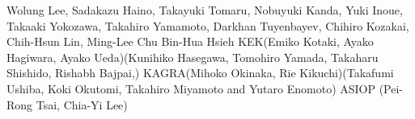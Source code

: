 Wolung Lee, Sadakazu Haino, Takayuki Tomaru, Nobuyuki Kanda, Yuki Inoue, Takaaki Yokozawa, Takahiro Yamamoto, Darkhan Tuyenbayev, Chihiro Kozakai, Chih-Hsun Lin, Ming-Lee Chu
Bin-Hua Hsieh KEK(Emiko Kotaki, Ayako Hagiwara, Ayako Ueda)(Kunihiko Hasegawa, Tomohiro Yamada, Takaharu Shishido, Rishabh Bajpai,) KAGRA(Mihoko Okinaka, Rie Kikuchi)(Takafumi Ushiba, Koki Okutomi, Takahiro Miyamoto and Yutaro Enomoto)  ASIOP (Pei-Rong Tsai, Chia-Yi Lee)


%
